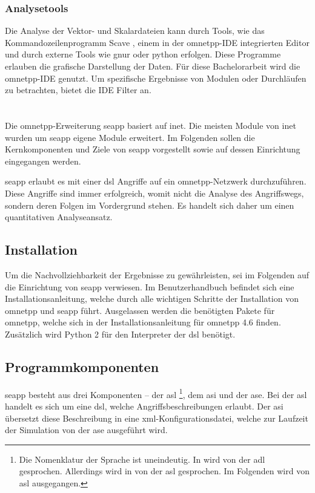 \subsubsection{Analysetools}  
Die Analyse der Vektor- und Skalardateien kann durch Tools, wie das Kommandozeilenprogramm Scave \cite[]{OmnetManual}, einem in der \gls{omnetpp}-IDE integrierten Editor und durch externe Tools wie \gls{gnur} oder \gls{python} \cite[]{OmnetManual} erfolgen. Diese Programme erlauben die grafische Darstellung der Daten. Für diese Bachelorarbeit wird die \gls{omnetpp}-IDE genutzt. Um spezifische Ergebnisse von Modulen oder Durchläufen zu betrachten, bietet die IDE Filter an. 

\section{}\label{sec:seapp}
Die \gls{omnetpp}-Erweiterung \gls{seapp} basiert auf \gls{inet}. Die meisten Module von \gls{inet} wurden um \gls{seapp} eigene Module erweitert. Im Folgenden sollen die Kernkomponenten und Ziele von \gls{seapp} vorgestellt sowie auf dessen Einrichtung eingegangen werden.

\gls{seapp} erlaubt es mit einer \gls{dsl} Angriffe auf ein \gls{omnetpp}-Netzwerk durchzuführen. Diese Angriffe sind immer erfolgreich, womit nicht die Analyse des Angriffswegs, sondern deren Folgen \cite[]{Tiloca2019} im Vordergrund stehen. Es handelt sich daher um einen quantitativen Analyseansatz.

\subsection{Installation}
Um die Nachvollziehbarkeit der Ergebnisse zu gewährleisten, sei im Folgenden auf die Einrichtung von \gls{seapp} verwiesen. Im Benutzerhandbuch \cite{SEAManual} befindet sich eine Installationsanleitung, welche durch alle wichtigen Schritte der Installation von \gls{omnetpp} und \gls{seapp} führt. Ausgelassen werden die benötigten Pakete für \gls{omnetpp}, welche sich in der Installationsanleitung \cite{Omnet4InstallationGuide} für \gls{omnetpp} 4.6 finden. Zusätzlich wird Python 2 für den Interpreter der \gls{dsl} benötigt.
 
\subsection{Programmkomponenten}
\gls{seapp} besteht aus drei Komponenten – der \gls{asl} \footnote{Die Nomenklatur der Sprache ist uneindeutig. In  \cite{SEAManual} wird von der \gls{adl} gesprochen. Allerdings wird in  \cite{Tiloca2019} von der \gls{asl} gesprochen. Im Folgenden wird von \gls{asl} ausgegangen.}, dem \gls{asi} und der \gls{ase}. Bei der \acrshort{asl} handelt es sich um eine \gls{dsl}, welche Angriffsbeschreibungen erlaubt. Der \acrshort{asi} übersetzt diese Beschreibung in eine \acrshort{xml}-Konfigurationsdatei, welche zur Laufzeit der Simulation von der \acrshort{ase} ausgeführt wird. \cite[]{Tiloca2019}


